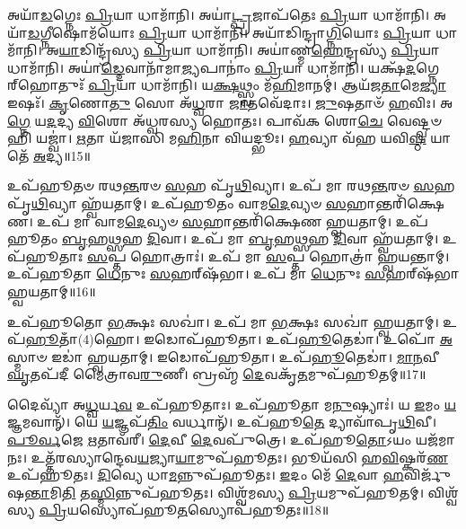𑌅𑌯𑌾᳴\-\ul{𑌡}\-𑌗𑍍𑌨𑍇𑌃 \ul{𑌪𑍍𑌰𑌿}\-𑌯𑌾 𑌧𑌾𑌮𑌾᳴𑌨𑌿।
𑌅𑌯𑌾॑\-\ul{𑌟𑍍𑌪𑍍𑌰}\-𑌜𑌾𑌪᳴𑌤𑍇𑌃 \ul{𑌪𑍍𑌰𑌿}\-𑌯𑌾 𑌧𑌾𑌮𑌾᳴𑌨𑌿।
𑌅𑌯𑌾᳴\-\ul{𑌡}\-𑌗𑍍𑌨𑍀𑌷𑍋𑌮᳴𑌯𑍋𑌃 \ul{𑌪𑍍𑌰𑌿}\-𑌯𑌾 𑌧𑌾𑌮𑌾᳴𑌨𑌿।
𑌅𑌯𑌾᳴𑌡𑌿𑌨𑍍𑌦𑍍𑌰𑌾\-\ul{𑌗𑍍𑌨𑌿}\-𑌯𑍋𑌃 \ul{𑌪𑍍𑌰𑌿}\-𑌯𑌾 𑌧𑌾𑌮𑌾᳴𑌨𑌿।
𑌅\-\ul{𑌯𑌾}\-𑌡𑌿𑌨𑍍𑌦𑍍𑌰᳴𑌸𑍍𑌯 \ul{𑌪𑍍𑌰𑌿}\-𑌯𑌾 𑌧𑌾𑌮𑌾᳴𑌨𑌿।
𑌅𑌯𑌾॑𑌣𑍍𑌮\-\ul{𑌹𑍇}\-𑌨𑍍𑌦𑍍𑌰𑌸𑍍𑌯᳴ \ul{𑌪𑍍𑌰𑌿}\-𑌯𑌾 𑌧𑌾𑌮𑌾᳴𑌨𑌿।
𑌅𑌯𑌾॑\-\ul{𑌡𑍍𑌦𑍇}\-𑌵𑌾𑌨𑌾᳴𑌮𑌾\-\ul{𑌜𑍍𑌯}\-𑌪𑌾𑌨𑌾𑌂॑ \ul{𑌪𑍍𑌰𑌿}\-𑌯𑌾 𑌧𑌾𑌮𑌾᳴𑌨𑌿।
𑌯𑌕𑍍𑌷᳴\-\ul{𑌦}\-𑌗𑍍𑌨𑍇𑌰𑍍‌\mbox{}𑌹𑍋𑌤𑍁𑌃᳴ \ul{𑌪𑍍𑌰𑌿}\-𑌯𑌾 𑌧𑌾𑌮𑌾᳴𑌨𑌿।
𑌯\-\ul{𑌕𑍍𑌷}\-𑌥𑍍𑌸𑍍𑌵𑌂 𑌮᳴\-\ul{𑌹𑌿}\-𑌮𑌾𑌨𑌮𑍍॑।
𑌆𑌯᳴𑌜\-\ul{𑌤𑌾}\-𑌮𑍇\-\ul{𑌜𑍍𑌯𑌾} 𑌇𑌷𑌃᳴।
\-\ul{𑌕𑍃}\-𑌣𑍋\-\ul{𑌤𑍁} 𑌸𑍋 𑌅᳴\-\ul{𑌧𑍍𑌵}\-𑌰𑌾 \ul{𑌜𑌾}\-𑌤𑌵𑍇᳴𑌦𑌾𑌃।
\-\ul{𑌜𑍁}\-𑌷𑌤𑌾𑍞᳴ \ul{𑌹}\-𑌵𑌿𑌃।
𑌅\-\ul{𑌗𑍍𑌨𑍇} 𑌯\-\ul{𑌦}\-𑌦𑍍𑌯 \ul{𑌵𑌿}\-𑌶𑍋 𑌅᳴𑌧𑍍𑌵𑌰𑌸𑍍𑌯 𑌹𑍋𑌤𑌃।
𑌪𑌾𑌵᳴𑌕 𑌶𑍋\-\ul{𑌚𑍇} 𑌵𑍇𑌷𑍍𑌟𑍍𑌵𑍞 𑌹𑌿 𑌯𑌜𑍍𑌵𑌾॑।
\-\ul{𑌋}\-𑌤𑌾 𑌯᳴𑌜𑌾𑌸𑌿 𑌮\-\ul{𑌹𑌿}\-𑌨𑌾 𑌵𑌿𑌯𑌦𑍍𑌭𑍂𑌃।
\-\ul{𑌹}\-𑌵𑍍𑌯𑌾 𑌵᳴𑌹 𑌯𑌵𑌿\-\ul{𑌷𑍍𑌠} 𑌯𑌾 𑌤𑍇᳴ \ul{𑌅}\-𑌦𑍍𑌯॥15॥\anuvakamend[\-\ul{𑌅}\-\-\ul{𑌸𑍍𑌤𑍍𑌵}\-\-\ul{𑌧}\-\-\ul{𑌤𑍍𑌤}\-\-\ul{𑍞} \ul{𑌰}\-𑌯𑌿𑌂 𑌚᳴𑌰𑍍‌\mbox{}𑌷\-\ul{𑌣𑌿}\-𑌪𑍍𑌰𑌾𑌃 𑌸𑍋𑌮᳴𑌸𑍍𑌯 \ul{𑌪𑍍𑌰𑌿}\-𑌯𑌾 𑌧𑌾\-\ul{𑌮𑌾}\-𑌨𑍀\-\ul{𑌷𑌃} 𑌷𑌟𑍍𑌚᳴]

𑌉𑌪᳴𑌹𑍂𑌤𑍞 𑌰𑌥\-\ul{𑌨𑍍𑌤}\-𑌰𑍞 \ul{𑌸}\-𑌹 𑌪𑍃᳴\-\ul{𑌥𑌿}\-𑌵𑍍𑌯𑌾।
𑌉𑌪᳴ 𑌮𑌾 𑌰𑌥\-\ul{𑌨𑍍𑌤}\-𑌰𑍞 \ul{𑌸}\-𑌹 𑌪𑍃᳴\-\ul{𑌥𑌿}\-𑌵𑍍𑌯𑌾 𑌹𑍍𑌵᳴𑌯𑌤𑌾𑌮𑍍।
𑌉𑌪᳴𑌹𑍂𑌤𑌂 𑌵𑌾𑌮\-\ul{𑌦𑍇}\-𑌵𑍍𑌯𑍞 \ul{𑌸}\-𑌹𑌾𑌨𑍍𑌤𑌰𑌿᳴𑌕𑍍𑌷𑍇𑌣।
𑌉𑌪᳴ 𑌮𑌾 𑌵𑌾𑌮\-\ul{𑌦𑍇}\-𑌵𑍍𑌯𑍞 \ul{𑌸}\-𑌹𑌾𑌨𑍍𑌤𑌰𑌿᳴𑌕𑍍𑌷𑍇𑌣 𑌹𑍍𑌵𑌯𑌤𑌾𑌮𑍍।
𑌉𑌪᳴𑌹𑍂𑌤𑌂 \ul{𑌬𑍃}\-𑌹\-\ul{𑌥𑍍𑌸}\-𑌹 \ul{𑌦𑌿}\-𑌵𑌾।
𑌉𑌪᳴ 𑌮𑌾 \ul{𑌬𑍃}\-𑌹\-\ul{𑌥𑍍𑌸}\-𑌹 \ul{𑌦𑌿}\-𑌵𑌾 𑌹𑍍𑌵᳴𑌯𑌤𑌾𑌮𑍍।
𑌉𑌪᳴𑌹𑍂𑌤𑌾𑌃 \ul{𑌸}\-𑌪𑍍𑌤 𑌹𑍋𑌤𑍍𑌰𑌾𑌃॑।
𑌉𑌪᳴ 𑌮𑌾 \ul{𑌸}\-𑌪𑍍𑌤 𑌹𑍋𑌤𑍍𑌰𑌾॑ 𑌹𑍍𑌵𑌯𑌨𑍍𑌤𑌾𑌮𑍍।
𑌉𑌪᳴𑌹𑍂𑌤𑌾 \ul{𑌧𑍇}\-𑌨𑍁𑌃 \ul{𑌸}\-𑌹𑌰𑍍‌\mbox{}𑌷᳴𑌭𑌾।
𑌉𑌪᳴ 𑌮𑌾 \ul{𑌧𑍇}\-𑌨𑍁𑌃 \ul{𑌸}\-𑌹𑌰𑍍‌\mbox{}𑌷᳴𑌭𑌾 𑌹𑍍𑌵𑌯𑌤𑌾𑌮𑍍॥16॥

𑌉𑌪᳴𑌹𑍂𑌤𑍋 \ul{𑌭}\-𑌕𑍍𑌷𑌃 𑌸𑌖𑌾॑।
𑌉𑌪᳴ 𑌮𑌾 \ul{𑌭}\-𑌕𑍍𑌷𑌃 𑌸𑌖𑌾॑ 𑌹𑍍𑌵𑌯𑌤𑌾𑌮𑍍।
𑌉𑌪᳴\-\ul{𑌹𑍂}\-𑌤𑌾𑌁(4)𑌹𑍋।
𑌇𑌡𑍋𑌪᳴𑌹𑍂𑌤𑌾।
𑌉𑌪᳴\-\ul{𑌹𑍂}\-𑌤𑍇𑌡𑌾॑।
𑌉𑌪𑍋᳴ \ul{𑌅}\-𑌸𑍍𑌮𑌾𑍞 𑌇𑌡𑌾॑ 𑌹𑍍𑌵𑌯𑌤𑌾𑌮𑍍।
𑌇𑌡𑍋𑌪᳴𑌹𑍂𑌤𑌾।
𑌉𑌪᳴\-\ul{𑌹𑍂}\-𑌤𑍇𑌡𑌾॑।
\-\ul{𑌮𑌾}\-\-\ul{𑌨}\-𑌵𑍀 \ul{𑌘𑍃}\-𑌤𑌪᳴𑌦𑍀 𑌮𑍈𑌤𑍍𑌰𑌾𑌵\-\ul{𑌰𑍁}\-𑌣𑍀।
𑌬𑍍𑌰𑌹𑍍𑌮᳴ \ul{𑌦𑍇}\-𑌵𑌕𑍃᳴\-\ul{𑌤}\-𑌮𑍁𑌪᳴𑌹𑍂𑌤𑌮𑍍॥17॥

𑌦𑍈𑌵𑍍𑌯𑌾᳴ 𑌅\-\ul{𑌧𑍍𑌵}\-𑌰𑍍𑌯\-\ul{𑌵} 𑌉𑌪᳴𑌹𑍂𑌤𑌾𑌃।
𑌉𑌪᳴𑌹𑍂𑌤𑌾 𑌮\-\ul{𑌨𑍁}\-𑌷𑍍𑌯𑌾𑌃॑।
𑌯 \ul{𑌇}\-𑌮𑌂 \ul{𑌯}\-𑌜𑍍𑌞𑌮𑌵𑌾𑌨𑍍᳴।
𑌯𑍇 \ul{𑌯}\-𑌜𑍍𑌞𑌪᳴\-\ul{𑌤𑌿𑌂} 𑌵𑌰𑍍𑌧𑌾𑌨𑍍᳴।
𑌉𑌪᳴𑌹𑍂\-\ul{𑌤𑍇} 𑌦𑍍𑌯𑌾𑌵𑌾᳴𑌪𑍃\-\ul{𑌥𑌿}\-𑌵𑍀।
\-\ul{𑌪𑍂}\-\-\ul{𑌰𑍍𑌵}\-𑌜𑍇 \ul{𑌋}\-𑌤𑌾𑌵᳴𑌰𑍀।
\-\ul{𑌦𑍇}\-𑌵𑍀 \ul{𑌦𑍇}\-𑌵𑌪𑍁᳴𑌤𑍍𑌰𑍇।
𑌉𑌪᳴𑌹𑍂\-\ul{𑌤𑍋}\-𑌽𑌯𑌂 𑌯𑌜᳴𑌮𑌾𑌨𑌃।
𑌉𑌤𑍍𑌤᳴𑌰𑌸𑍍𑌯𑌾𑌨𑍍𑌦𑍇𑌵\-\ul{𑌯}\-𑌜𑍍𑌯𑌾\-\ul{𑌯𑌾}\-𑌮𑍁𑌪᳴𑌹𑍂𑌤𑌃।
𑌭𑍂𑌯᳴𑌸𑌿 𑌹\-\ul{𑌵𑌿}\-𑌷𑍍𑌕𑌰᳴\-\ul{𑌣} 𑌉𑌪᳴𑌹𑍂𑌤𑌃।
\-\ul{𑌦𑌿}\-𑌵𑍍𑌯𑍇 𑌧𑌾\-\ul{𑌮}\-𑌨𑍍𑌨𑍁𑌪᳴𑌹𑍂𑌤𑌃।
\-\ul{𑌇}\-𑌦𑌂 𑌮𑍇᳴ \ul{𑌦𑍇}\-𑌵𑌾 \ul{𑌹}\-𑌵𑌿𑌰𑍍𑌜𑍁᳴𑌷\-\ul{𑌨𑍍𑌤𑌾}\-𑌮𑌿\-\ul{𑌤𑌿} 𑌤\-\ul{𑌸𑍍𑌮𑌿}\-𑌨𑍍𑌨𑍁𑌪᳴𑌹𑍂𑌤𑌃।
𑌵𑌿𑌶𑍍𑌵᳴𑌮𑌸𑍍𑌯 \ul{𑌪𑍍𑌰𑌿}\-𑌯𑌮𑍁𑌪᳴𑌹𑍂𑌤𑌮𑍍।
𑌵𑌿𑌶𑍍𑌵᳴𑌸𑍍𑌯 \ul{𑌪𑍍𑌰𑌿}\-𑌯𑌸𑍍𑌯𑍋𑌪᳴𑌹𑍂\-\ul{𑌤}\-𑌸𑍍𑌯𑍋𑌪᳴𑌹𑍂𑌤𑌃॥18॥\anuvakamend[\-\ul{𑌸}\-𑌹𑌰𑍍‌\mbox{}𑌷᳴𑌭𑌾 𑌹𑍍𑌵𑌯\-\ul{𑌤𑌾}\-𑌮𑍁𑌪᳴𑌹𑍂𑌤𑍞 𑌹\-\ul{𑌵𑌿}\-𑌷𑍍𑌕𑌰᳴\-\ul{𑌣} 𑌉𑌪᳴𑌹𑍂𑌤\-\ul{𑌶𑍍𑌚}\-𑌤𑍍𑌵𑌾𑌰𑌿᳴ 𑌚]

